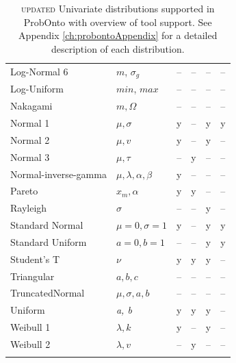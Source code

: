 {\begin{center}
\begin{longtable}{l | lcccc}
Log-Normal 6			& $m$, $\sigma_g$	& 	--	&	--	&	--	&  -- \\
Log-Uniform			& $min$, $max$	& 	--	&	--	&	--	&  -- \\
Nakagami				& $m, \Omega$	&	--	&	--	&	--	&  --  \\
Normal 1				& $\mu, \sigma$	&	y	&	--	&	y	& y  \\
Normal 2				& $\mu, v$		&	y	&	--	&	y	&  -- \\
Normal 3				& $\mu, \tau$		&	--	&	y	&	--	&  -- \\
Normal-inverse-gamma	& $\mu, \lambda, \alpha, \beta$	& y	& --  & --  &  -- \\
Pareto				& $x_m, \alpha$	& y	& y	& --  &  -- \\
Rayleigh				& $\sigma$		& --  & --  & y	&  -- \\
Standard Normal 		& $\mu\!=\!0, \sigma\!=\!1$	& y & -- &	 y & y  \\
Standard Uniform		& $a\!=\!0, b\!=\!1$		& --	& --	& y & y  \\
Student's T			& $\nu$			& y	& y	& y	&  -- \\
Triangular				& $a, b, c$		& -- 	& --	& -- & -- \\
TruncatedNormal		& $\mu, \sigma, a, b$ & --	& --  & -- & -- \\
Uniform				&  \emph{a, b}		& y	& y	& y		& --  \\
Weibull 1				& $\lambda, k$		& y	& --	& y	&  -- \\
Weibull 2				& $\lambda, v$		& --	& y	& --	&  -- \\
   \hline 
\caption{{\color{red} \scshape{updated}} Univariate distributions supported in ProbOnto with overview of tool support. 
See Appendix \ref{ch:probontoAppendix} for a detailed description of each distribution.}
\label{figTable:univariates}
\vspace{-2.5em}
\end{longtable}
\end{center}

}
